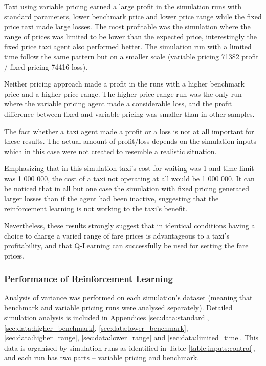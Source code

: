 Taxi using variable pricing earned a large profit in the simulation runs with
standard parameters, lower benchmark price and lower price range while the
fixed price taxi made large losses. The most profitable was the simulation
where the range of prices was limited to be lower than the expected price,
interestingly the fixed price taxi agent also performed better. The simulation
run with a limited time follow the same pattern but on a smaller scale
(variable pricing 71382 profit / fixed pricing 74416 loss).

Neither pricing approach made a profit in the runs with a higher benchmark
price and a higher price range. The higher price range run was the only run
where the variable pricing agent made a considerable loss, and the profit
difference between fixed and variable pricing was smaller than in other
samples.

The fact whether a taxi agent made a profit or a loss is not at all important
for these results. The actual amount of profit/loss depends on the simulation
inputs which in this case were not created to resemble a realistic situation.

Emphasizing that in this simulation taxi's cost for waiting was 1 and time
limit was 1 000 000, the cost of a taxi not operating at all would be 1 000
000. It can be noticed that in all but one case the simulation with fixed
pricing generated larger losses than if the agent had been inactive, suggesting
that the reinforcement learning is not working to the taxi's benefit.

Nevertheless, these results strongly suggest that in identical conditions
having a choice to charge a varied range of fare prices is advantageous to a
taxi's profitability, and that Q-Learning can successfully be used for setting
the fare prices.


\subsubsection{Performance of Reinforcement Learning}
\label{sec:results:stats}

Analysis of variance was performed on each simulation's dataset (meaning that
benchmark and variable pricing runs were analysed separately). Detailed
simulation analysis is included in Appendices \ref{sec:data:standard},
\ref{sec:data:higher_benchmark}, \ref{sec:data:lower_benchmark},
\ref{sec:data:higher_range}, \ref{sec:data:lower_range} and
\ref{sec:data:limited_time}. This data is organised by simulation runs as
identified in Table \ref{table:inputs:control}, and each run has two parts --
variable pricing and benchmark.

